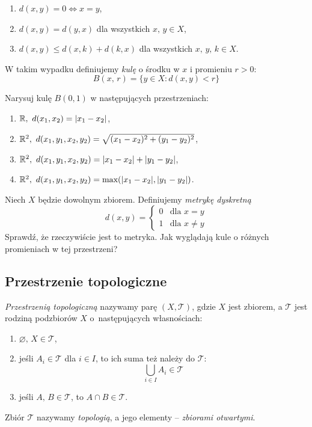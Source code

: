\begin{enumerate}
  \item $d(x,y)=0\Leftrightarrow x=y$,
  \item $d(x,y)=d(y,x)$ dla wszystkich $x,\, y\in X$,
  \item $d(x,y) \le d(x,k) + d(k, x)$ dla wszystkich $x,\, y,\, k\in X$.
\end{enumerate}

W takim wypadku definiujemy \emph{kulę} o środku w $x$ i promieniu $r>0$:
\[
  B(x,\, r)=\{y\in X : d(x,y) < r\}
\]

\begin{problem}
  Narysuj kulę $B(0, 1)$ w następujących przestrzeniach:

  \begin{enumerate}
    \item $\mathbb{R}, ~d(x_1,x_2)=|x_1-x_2|$,
    \item $\mathbb{R}^2,~d(x_1, y_1, x_2, y_2)=\sqrt{(x_1-x_2)^2+(y_1-y_2)^2}$,
    \item $\mathbb{R}^2,~d(x_1, y_1, x_2, y_2) = |x_1-x_2| + |y_1-y_2|$,
    \item $\mathbb{R}^2,~d(x_1, y_1, x_2, y_2) = \text{max}(|x_1-x_2|, |y_1-y_2|)$.
  \end{enumerate}
\end{problem}

\begin{problem}
  Niech $X$ będzie dowolnym zbiorem. Definiujemy \emph{metrykę dyskretną}
  \[
    d(x, y) = \begin{cases}
                0 & \text{dla }x = y\\
                1 & \text{dla }x\neq y
            \end{cases}
  \]
  Sprawdź, że rzeczywiście jest to metryka. Jak wyglądają kule o różnych promieniach w tej przestrzeni?
\end{problem}


\subsection{Przestrzenie topologiczne}
\emph{Przestrzenią topologiczną} nazywamy parę $(X, \mathcal T)$, gdzie $X$ jest zbiorem, a $\mathcal T$ jest rodziną podzbiorów $X$ o~następujących własnościach:
\begin{enumerate}
  \item $\varnothing,\, X\in \mathcal T$,
  \item jeśli $A_i\in \mathcal T$ dla $i\in I$, to ich suma też należy do $\mathcal T$:
    \[\bigcup_{i\in I}A_i\in \mathcal T\]
  \item jeśli $A,\, B\in \mathcal T$, to $A\cap B\in\mathcal T$.
\end{enumerate}
Zbiór $\mathcal T$ nazywamy \emph{topologią}, a jego elementy -- \emph{zbiorami otwartymi}.


